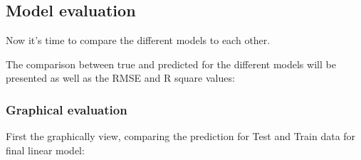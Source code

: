 \documentclass[
]{article}
\begin{document}
\hypertarget{model-evaluation}{%
\subsection{Model evaluation}\label{model-evaluation}}

Now it's time to compare the different models to each other.

The comparison between true and predicted for the different models will
be presented as well as the RMSE and R square values:

\hypertarget{graphical-evaluation}{%
\subsubsection{Graphical evaluation}\label{graphical-evaluation}}

First the graphically view, comparing the prediction for Test and Train
data for final linear model:
\end{document}
